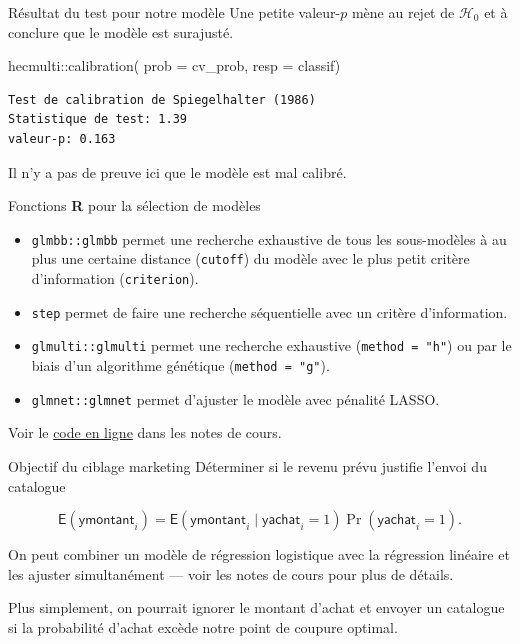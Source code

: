 \documentclass[
  ignorenonframetext,
]{beamer}
\newenvironment{Shaded}{\begin{snugshade}}{\end{snugshade}}
\newcommand{\AttributeTok}[1]{\textcolor[rgb]{0.40,0.45,0.13}{#1}}
\newcommand{\FunctionTok}[1]{\textcolor[rgb]{0.28,0.35,0.67}{#1}}
\newcommand{\NormalTok}[1]{\textcolor[rgb]{0.00,0.23,0.31}{#1}}
\newcommand{\SpecialCharTok}[1]{\textcolor[rgb]{0.37,0.37,0.37}{#1}}
\providecommand{\tightlist}{%
  \setlength{\itemsep}{0pt}\setlength{\parskip}{0pt}}\usepackage{longtable,booktabs,array}
\begin{document}
\begin{frame}[fragile]{Résultat du test pour notre modèle}
\label{ruxe9sultat-du-test-pour-notre-moduxe8le}
Une petite valeur-\(p\) mène au rejet de \(\mathcal{H}_0\) et à conclure
que le modèle est surajusté.

\begin{Shaded}
\begin{Highlighting}[numbers=left,,]
\NormalTok{hecmulti}\SpecialCharTok{::}\FunctionTok{calibration}\NormalTok{(}
   \AttributeTok{prob =}\NormalTok{ cv\_prob, }
   \AttributeTok{resp =}\NormalTok{ classif)}
\end{Highlighting}
\end{Shaded}

\begin{verbatim}
Test de calibration de Spiegelhalter (1986)
Statistique de test: 1.39 
valeur-p: 0.163
\end{verbatim}

Il n'y a pas de preuve ici que le modèle est mal calibré.
\end{frame}

\begin{frame}[fragile]{Fonctions \textbf{R} pour la sélection de
modèles}
\label{fonctions-r-pour-la-suxe9lection-de-moduxe8les}
\begin{itemize}
\tightlist
\item
  \texttt{glmbb::glmbb} permet une recherche exhaustive de tous les
  sous-modèles à au plus une certaine distance (\texttt{cutoff}) du
  modèle avec le plus petit critère d'information (\texttt{criterion}).
\item
  \texttt{step} permet de faire une recherche séquentielle avec un
  critère d'information.
\item
  \texttt{glmulti::glmulti} permet une recherche exhaustive
  (\texttt{method\ =\ "h"}) ou par le biais d'un algorithme génétique
  (\texttt{method\ =\ "g"}).
\item
  \texttt{glmnet::glmnet} permet d'ajuster le modèle avec pénalité
  LASSO.
\end{itemize}

Voir le
\href{https://lbelzile.github.io/math60602/05-reglogistique.html\#s\%C3\%A9lection-de-variables-en-r\%C3\%A9gression-logistique}{code
en ligne} dans les notes de cours.
\end{frame}

\begin{frame}{Objectif du ciblage marketing}
\label{objectif-du-ciblage-marketing}
Déterminer si le revenu prévu justifie l'envoi du catalogue

\[\mathsf{E}(\textsf{ymontant}_i) = \mathsf{E}(\textsf{ymontant}_i \mid \textsf{yachat}_i = 1)\Pr(\textsf{yachat}_i = 1).\]

On peut combiner un modèle de régression logistique avec la régression
linéaire et les ajuster simultanément --- voir les notes de cours pour
plus de détails.

Plus simplement, on pourrait ignorer le montant d'achat et envoyer un
catalogue si la probabilité d'achat excède notre point de coupure
optimal.
\end{frame}
\end{document}
